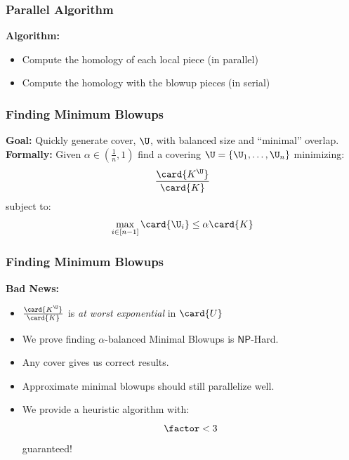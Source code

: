\begin{frame}
\frametitle{Parallel Algorithm}
\begin{figure}[t]
\def\svgwidth{.8\textwidth} 

\end{figure}
\hspace{-.5cm}\textbf{Algorithm:}
\begin{itemize} 
	\item<1->[Step 1:] Compute the homology of each local piece (in parallel)
	\item<2->[Step 2:] Compute the homology with the blowup pieces (in serial)
\end{itemize}
\end{frame}

\begin{frame}
\frametitle{Finding Minimum Blowups}
\textbf{Goal:} Quickly generate cover, $\U$, with balanced size and ``minimal''
overlap.  \\
\vspace{.1cm}
\pause
\textbf{Formally:} 
Given $\alpha \in (\frac{1}{n},1)$ find a covering 
$\U = \{ \U_1, \ldots, \U_n \}$ minimizing: 
\[ \frac{\card{K^\U}}{\card{K}} \] \pause 
subject to:  
\[ \max_{i\in[n-1]}{\card{\U_{i}}} \leq \alpha \card{K} \] \pause 
\end{frame}

\begin{frame}
\frametitle{Finding Minimum Blowups} 
\textbf{Bad News:}
\begin{itemize}
\item<1-> $\frac{\card{K^\U}}{\card{K}}$ is \emph{at worst exponential} in
	$\card{U}$ 
\item<2-> We prove finding $\alpha$-balanced Minimal Blowups is
	$\mathsf{NP}$-Hard.
\end{itemize}
\begin{itemize}
\item<3-> Any cover gives us correct results. 
\item<4-> Approximate minimal blowups should still parallelize well.
\item<5-> We provide a heuristic algorithm with:
	\only<6-> {
		\[ \factor < 3 \]
		guaranteed!
	}
\end{itemize}
\end{frame}

